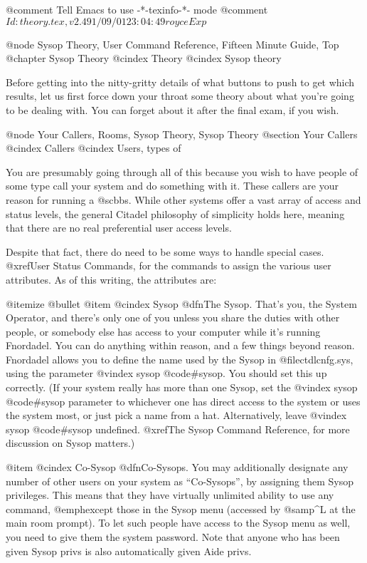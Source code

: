 @comment Tell Emacs to use -*-texinfo-*- mode
@comment $Id: theory.tex,v 2.4 91/09/01 23:04:49 royce Exp $

@node Sysop Theory, User Command Reference, Fifteen Minute Guide, Top
@chapter Sysop Theory
@cindex Theory
@cindex Sysop theory

Before getting into the nitty-gritty details of what buttons to push
to get which results, let us first force down your throat some theory about
what you're going to be dealing with.  You can forget about it after the
final exam, if you wish.

@node Your Callers, Rooms, Sysop Theory, Sysop Theory
@section Your Callers
@cindex Callers
@cindex Users, types of

You are presumably going through all of this because you
wish to have people of some type call your system and do something
with it.  These callers are your reason for running a @sc{bbs}.  While
other systems offer a vast array of access and status levels,
the general Citadel philosophy of simplicity holds here, meaning
that there are no real preferential user access levels.

Despite that fact, there do need to be some ways to handle
special cases.  @xref{User Status Commands}, for the commands to assign the
various user attributes.  As of this writing, the attributes are:

@itemize @bullet
@item
@cindex Sysop
@dfn{The Sysop}.  That's you, the System Operator, and there's only one of you
unless you share the duties with other people, or
somebody else has access to your computer while it's
running Fnordadel.  You can do anything within reason,
and a few things beyond reason.  Fnordadel allows you to define
the name used by the Sysop in @file{ctdlcnfg.sys}, using the parameter
@vindex sysop
@code{#sysop}.  You should set this up correctly.  (If your system really
has more than one Sysop, set the
@vindex sysop
@code{#sysop} parameter to whichever one
has direct access to the system or uses the system most, or just pick a name
from a hat.  Alternatively, leave
@vindex sysop
@code{#sysop} undefined.
@xref{The Sysop Command Reference}, for more discussion on Sysop matters.)

@item
@cindex Co-Sysop
@dfn{Co-Sysops}.  You may additionally designate any number of other
users on your system as ``Co-Sysops'', by assigning them Sysop privileges.
This means that they have virtually
unlimited ability to use any command, @emph{except} those in the
Sysop menu (accessed by @samp{^L} at the main room prompt).
To let such people have access to the Sysop menu as well, you need
to give them the system password.  Note that anyone who has
been given Sysop privs is also automatically given Aide privs.

